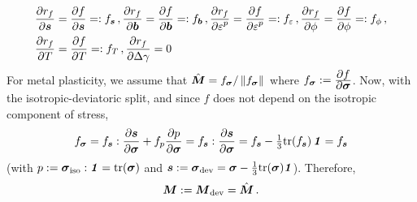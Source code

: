 \[
  \Bal
  \Partial{r_{f}}{\BsT} &=  \Partial{f}{\BsT} =: f_{\BsT} \,,
  \Partial{r_{f}}{\BbT} = \Partial{f}{\BbT} =: f_{\BbT} \,,
  \Partial{r_{f}}{\Ve^p} = \Partial{f}{\Ve^p} =: f_{\Ve} \,,
  \Partial{r_{f}}{\phi} = \Partial{f}{\phi} =: f_{\phi} \,, \\
  \Partial{r_{f}}{T} &= \Partial{f}{T} =: f_{T} \,,
  \Partial{r_{f}}{\Delta\gamma} = 0
  \Eal
\]
For metal plasticity, we assume that $\hat{\BM} = f_{\Bsig}/\Norm{f_{\Bsig}}{}$ where
$f_{\Bsig} := \Partial{f}{\Bsig}$.  Now, with the isotropic-deviatoric split, and since
$f$ does not depend on the isotropic component of stress, 
\[
  f_{\Bsig} = f_{\BsT}:\Partial{\BsT}{\Bsig} + f_{p} \Partial{p}{\Bsig}
   = f_{\BsT}:\Partial{\BsT}{\Bsig} = f_{\BsT} - \Third \Tr(f_{\BsT})\,\Bone = f_{\BsT}
\]
(with $p := \Bsig_\Tiso : \Bone = \Tr(\Bsig)$ and $\BsT := \Bsig_\Tdev = \Bsig - \Third\Tr(\Bsig)\Bone$).  
Therefore, 
\[
  \BM := \BM_\Tdev = \hat{\BM} \,.
\]

